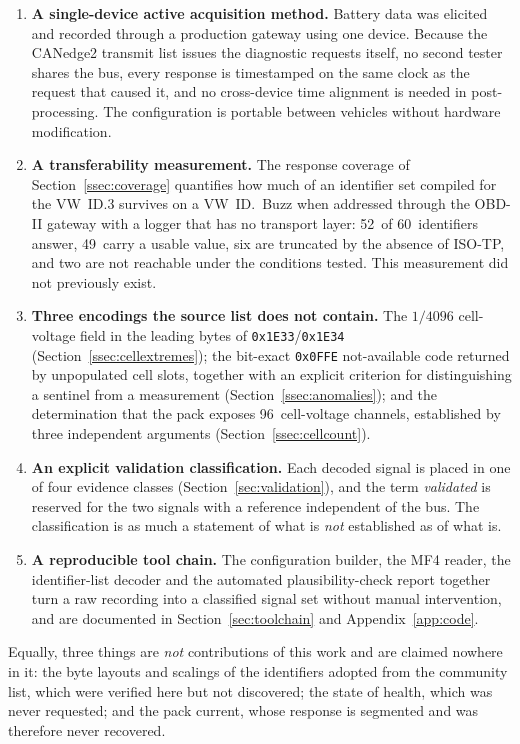 \documentclass[11pt,a4paper,oneside,parskip=half]{scrreprt}
\providecommand{\hex}{}\renewcommand{\hex}[1]{\texttt{0x#1}}
\begin{document}
\begin{enumerate}
  \item \textbf{A single-device active acquisition method.} Battery data was elicited and recorded through a production gateway using one device. Because the CANedge2 transmit list issues the diagnostic requests itself, no second tester shares the bus, every response is timestamped on the same clock as the request that caused it, and no cross-device time alignment is needed in post-processing. The configuration is portable between vehicles without hardware modification.
  \item \textbf{A transferability measurement.} The response coverage of Section~\ref{ssec:coverage} quantifies how much of an identifier set compiled for the VW~ID.3 survives on a VW~ID.~Buzz when addressed through the OBD-II gateway with a logger that has no transport layer: 52~of 60~identifiers answer, 49~carry a usable value, six are truncated by the absence of ISO-TP, and two are not reachable under the conditions tested. This measurement did not previously exist.
  \item \textbf{Three encodings the source list does not contain.} The $1/4096$ cell-voltage field in the leading bytes of \hex{1E33}/\hex{1E34} (Section~\ref{ssec:cellextremes}); the bit-exact \hex{0FFE} not-available code returned by unpopulated cell slots, together with an explicit criterion for distinguishing a sentinel from a measurement (Section~\ref{ssec:anomalies}); and the determination that the pack exposes 96~cell-voltage channels, established by three independent arguments (Section~\ref{ssec:cellcount}).
  \item \textbf{An explicit validation classification.} Each decoded signal is placed in one of four evidence classes (Section~\ref{sec:validation}), and the term \emph{validated} is reserved for the two signals with a reference independent of the bus. The classification is as much a statement of what is \emph{not} established as of what is.
  \item \textbf{A reproducible tool chain.} The configuration builder, the MF4 reader, the identifier-list decoder and the automated plausibility-check report together turn a raw recording into a classified signal set without manual intervention, and are documented in Section~\ref{sec:toolchain} and Appendix~\ref{app:code}.
\end{enumerate}

\noindent Equally, three things are \emph{not} contributions of this work and are claimed nowhere in it: the byte layouts and scalings of the identifiers adopted from the community list, which were verified here but not discovered; the state of health, which was never requested; and the pack current, whose response is segmented and was therefore never recovered.
\end{document}
